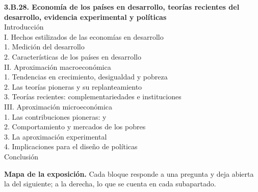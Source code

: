 \documentclass[11pt]{article}
\begin{document}
\begin{esquema}
\textbf{3.B.28. Economía de los países en desarrollo, teorías recientes del desarrollo, evidencia experimental y políticas}\\[2pt]
Introducción\\
I. Hechos estilizados de las economías en desarrollo\\
\hspace*{1.5em}1. Medición del desarrollo\\
\hspace*{1.5em}2. Características de los países en desarrollo\\
II. Aproximación macroeconómica\\
\hspace*{1.5em}1. Tendencias en crecimiento, desigualdad y pobreza\\
\hspace*{1.5em}2. Las teorías pioneras y su replanteamiento\\
\hspace*{1.5em}3. Teorías recientes: complementariedades e instituciones\\
III. Aproximación microeconómica\\
\hspace*{1.5em}1. Las contribuciones pioneras:  y \\
\hspace*{1.5em}2. Comportamiento y mercados de los pobres\\
\hspace*{1.5em}3. La aproximación experimental\\
\hspace*{1.5em}4. Implicaciones para el diseño de políticas\\
Conclusión
\end{esquema}

\begin{anotaciones}
\textbf{Mapa de la exposición.} Cada bloque responde a una pregunta y deja abierta la del siguiente; a la derecha, lo que se cuenta en cada subapartado.
\begin{infografiacaja}
\caption{Mapa del tema: la pregunta de cada bloque y el hilo que los une}\label{figu:mapa-tema}
\end{infografiacaja}
\end{anotaciones}
\end{document}
